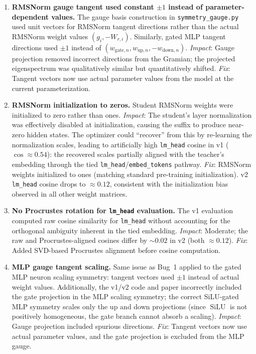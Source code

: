 \documentclass{article}
\DeclareMathOperator{\SiLU}{SiLU}
\begin{document}
\begin{enumerate}
    \item \textbf{RMSNorm gauge tangent used constant $\pm 1$ instead of parameter-dependent values.}  The gauge basis construction in \texttt{symmetry\_gauge.py} used unit vectors for RMSNorm tangent directions rather than the actual RMSNorm weight values $(g_i, -W_{r,i})$.  Similarly, gated MLP tangent directions used $\pm 1$ instead of $(w_{\text{gate},n}, w_{\text{up},n}, -w_{\text{down},n})$.  \emph{Impact}: Gauge projection removed incorrect directions from the Gramian; the projected eigenspectrum was qualitatively similar but quantitatively shifted.  \emph{Fix}: Tangent vectors now use actual parameter values from the model at the current parameterization.

    \item \textbf{RMSNorm initialization to zeros.}  Student RMSNorm weights were initialized to zero rather than ones.  \emph{Impact}: The student's layer normalization was effectively disabled at initialization, causing the suffix to produce near-zero hidden states.  The optimizer could ``recover'' from this by re-learning the normalization scales, leading to artificially high \texttt{lm\_head} cosine in v1 ($\cos \approx 0.54$): the recovered scales partially aligned with the teacher's embedding through the tied \texttt{lm\_head}/\texttt{embed\_tokens} pathway.  \emph{Fix}: RMSNorm weights initialized to ones (matching standard pre-training initialization).  v2 \texttt{lm\_head} cosine drops to $\approx 0.12$, consistent with the initialization bias observed in all other weight matrices.

    \item \textbf{No Procrustes rotation for \texttt{lm\_head} evaluation.}  The v1 evaluation computed raw cosine similarity for \texttt{lm\_head} without accounting for the orthogonal ambiguity inherent in the tied embedding.  \emph{Impact}: Moderate; the raw and Procrustes-aligned cosines differ by $\sim 0.02$ in v2 (both $\approx 0.12$).  \emph{Fix}: Added SVD-based Procrustes alignment before cosine computation.

    \item \textbf{MLP gauge tangent scaling.}  Same issue as Bug~1 applied to the gated MLP neuron scaling symmetry: tangent vectors used $\pm 1$ instead of actual weight values.  Additionally, the v1/v2 code and paper incorrectly included the gate projection in the MLP scaling symmetry; the correct SiLU-gated MLP symmetry scales only the up and down projections (since $\SiLU$ is not positively homogeneous, the gate branch cannot absorb a scaling).  \emph{Impact}: Gauge projection included spurious directions.  \emph{Fix}: Tangent vectors now use actual parameter values, and the gate projection is excluded from the MLP gauge.
\end{enumerate}
\end{document}
